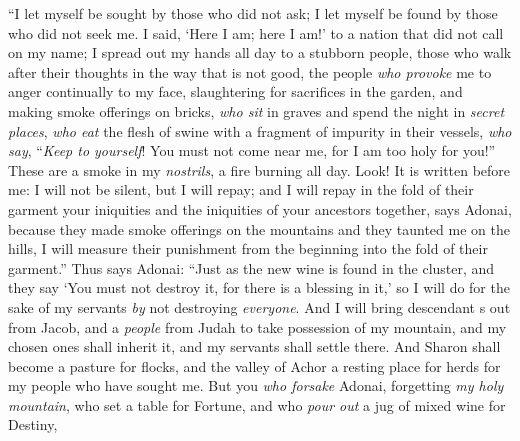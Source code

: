 \begin{biblechapter} %
 “I let myself be sought by those who did not ask; 
I let myself be found by those who did not seek me. 
I said, ‘Here I am; here I am!’ to a nation that did not call on my name;
\verse I spread out my hands all day to a stubborn people, 
those who walk after their thoughts in the way that is not good,
\verse the people \textit{who provoke} me to anger continually to my face, 
slaughtering for sacrifices in the garden, 
and making smoke offerings on bricks,
\verse \textit{who sit} in graves 
and spend the night in \textit{secret places}, 
\textit{who eat} the flesh of swine 
with a fragment of impurity in their vessels,
\verse \textit{who say}, “\textit{Keep to yourself}! 
You must not come near me, for I am too holy for you!” 
These are a smoke in my \textit{nostrils}, 
a fire burning all day.
\verse Look! It is written before me: I will not be silent, but I will repay; 
and I will repay in the fold of their garment
\verse your iniquities and the iniquities of your ancestors together, says Adonai, 
because they made smoke offerings on the mountains 
and they taunted me on the hills, 
I will measure their punishment from the beginning into the fold of their garment.”
\verse Thus says Adonai: “Just as the new wine is found in the cluster, and they say ‘You must not destroy it, for there is a blessing in it,’ so I will do for the sake of my servants \textit{by} not destroying \textit{everyone}.
\verse And I will bring descendant s out from Jacob, 
and a \textit{people} from Judah to take possession of my mountain, 
and my chosen ones shall inherit it, 
and my servants shall settle there.
\verse And Sharon shall become a pasture for flocks, 
and the valley of Achor a resting place for herds 
for my people who have sought me.
\verse But you \textit{who forsake} Adonai, 
forgetting \textit{my holy mountain}, 
who set a table for Fortune, 
and who \textit{pour out} a jug of mixed wine for Destiny,

\end{biblechapter}
